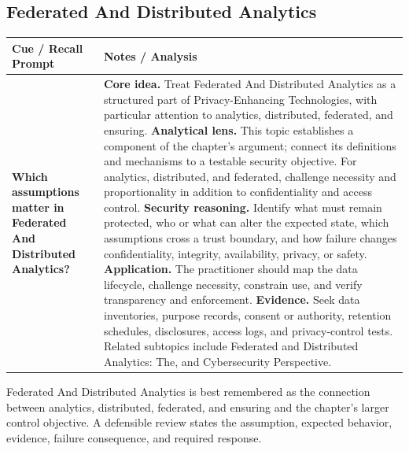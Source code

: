 \documentclass[11pt]{article}
\newcommand{\CornellHeader}{%
\rowcolor{Navy}\color{white}\bfseries Cue / Recall Prompt & \color{white}\bfseries Notes / Analysis\\\hline}
\newcommand{\CornellRow}[2]{%
\cellcolor{CueGray}\RaggedRight\textbf{#1} & \RaggedRight #2\\\hline}
\begin{document}
\subsection*{Federated And Distributed Analytics}
\begin{longtable}{>{\RaggedRight\arraybackslash}p{}|>{\RaggedRight\arraybackslash}p{}}
\CornellHeader
\CornellRow{Which assumptions matter in Federated And Distributed Analytics?}{\textbf{Core idea.} Treat Federated And Distributed Analytics as a structured part of Privacy-Enhancing Technologies, with particular attention to analytics, distributed, federated, and ensuring. \textbf{Analytical lens.} This topic establishes a component of the chapter's argument; connect its definitions and mechanisms to a testable security objective. For analytics, distributed, and federated, challenge necessity and proportionality in addition to confidentiality and access control. \textbf{Security reasoning.} Identify what must remain protected, who or what can alter the expected state, which assumptions cross a trust boundary, and how failure changes confidentiality, integrity, availability, privacy, or safety. \textbf{Application.} The practitioner should map the data lifecycle, challenge necessity, constrain use, and verify transparency and enforcement. \textbf{Evidence.} Seek data inventories, purpose records, consent or authority, retention schedules, disclosures, access logs, and privacy-control tests. Related subtopics include Federated and Distributed Analytics: The, and Cybersecurity Perspective.}
\end{longtable}
\begin{topicsummary}
Federated And Distributed Analytics is best remembered as the connection between analytics, distributed, federated, and ensuring and the chapter's larger control objective. A defensible review states the assumption, expected behavior, evidence, failure consequence, and required response.
\end{topicsummary}
\end{document}
